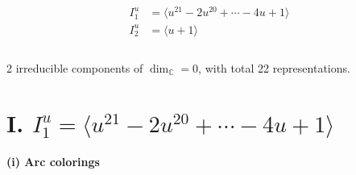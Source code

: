 \documentclass[1p]{elsarticle_modified}
\theoremstyle{definition}
\begin{document}
\begin{align*}
I^u_{1}&=\langle 
u^{21}-2 u^{20}+\cdots-4 u+1\rangle \\
I^u_{2}&=\langle 
u+1\rangle \\
\\
\end{align*}
\raggedright * 2 irreducible components of $\dim_{\mathbb{C}}=0$, with total 22 representations.\\
\newpage
\renewcommand{\arraystretch}{1}
\centering \section*{I. $I^u_{1}= \langle u^{21}-2 u^{20}+\cdots-4 u+1 \rangle$}
\flushleft \textbf{(i) Arc colorings}\\
\end{document}
